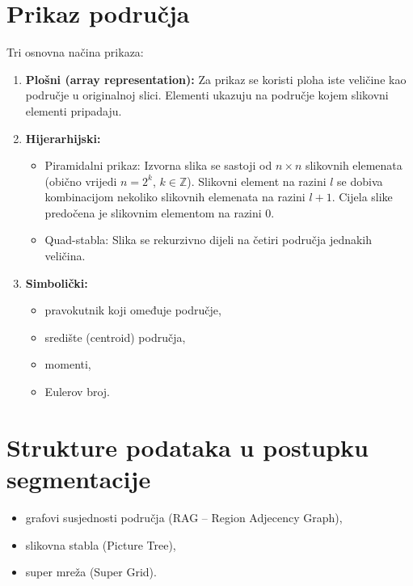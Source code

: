 \documentclass[11pt,english]{article}
\begin{document}
\section{Prikaz područja}
Tri osnovna načina prikaza:
\begin{enumerate}
  \item \textbf{Plošni (array representation):}
Za prikaz se koristi ploha iste veličine kao područje u originalnoj slici. Elementi ukazuju na područje kojem slikovni elementi pripadaju.
  \item \textbf{Hijerarhijski:}
  \begin{itemize}
    \item Piramidalni prikaz:
Izvorna slika se sastoji od $n \times n$ slikovnih elemenata (obično vrijedi $n = 2^k$, $k \in \mathbb Z$). Slikovni element na razini $l$ se dobiva kombinacijom nekoliko slikovnih elemenata na razini $l+1$. Cijela slike predočena je slikovnim elementom na razini 0.
    \item Quad-stabla:
Slika se rekurzivno dijeli na četiri područja jednakih veličina.
  \end{itemize}
  \item \textbf{Simbolički:}
    \begin{itemize}
      \item pravokutnik koji omeđuje područje,
      \item središte (centroid) područja,
      \item momenti,
      \item Eulerov broj.
    \end{itemize}
\end{enumerate}

\section{Strukture podataka u postupku segmentacije}
\begin{itemize}
  \item grafovi susjednosti područja (RAG -- Region Adjecency Graph),
  \item slikovna stabla (Picture Tree),
  \item super mreža (Super Grid).
\end{itemize}
\end{document}
